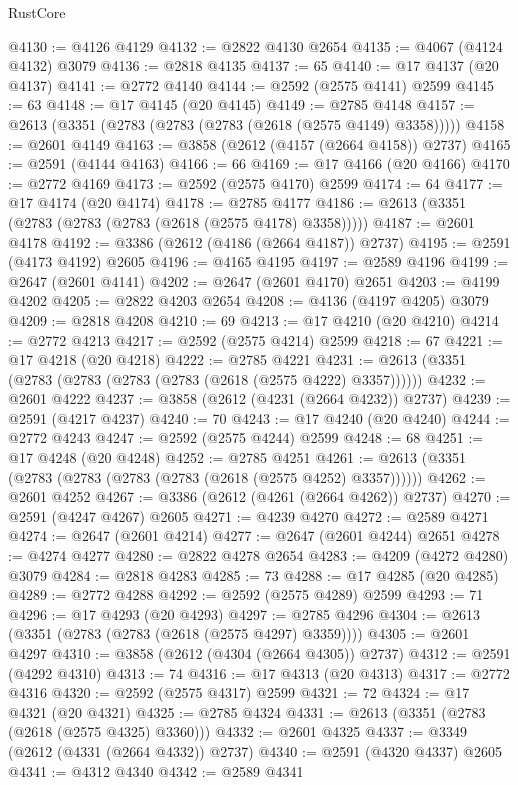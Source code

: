 \begin{lexlean}{RustCore}
\begin{coremodule}
@4130 := @4126 @4129
@4132 := @2822 @4130 @2654
@4135 := @4067 (@4124 @4132) @3079
@4136 := @2818 @4135
@4137 := 65
@4140 := @17 @4137 (@20 @4137)
@4141 := @2772 @4140
@4144 := @2592 (@2575 @4141) @2599
@4145 := 63
@4148 := @17 @4145 (@20 @4145)
@4149 := @2785 @4148
@4157 := @2613 (@3351 (@2783 (@2783 (@2783 (@2618 (@2575 @4149) @3358)))))
@4158 := @2601 @4149
@4163 := @3858 (@2612 (@4157 (@2664 @4158)) @2737)
@4165 := @2591 (@4144 @4163)
@4166 := 66
@4169 := @17 @4166 (@20 @4166)
@4170 := @2772 @4169
@4173 := @2592 (@2575 @4170) @2599
@4174 := 64
@4177 := @17 @4174 (@20 @4174)
@4178 := @2785 @4177
@4186 := @2613 (@3351 (@2783 (@2783 (@2783 (@2618 (@2575 @4178) @3358)))))
@4187 := @2601 @4178
@4192 := @3386 (@2612 (@4186 (@2664 @4187)) @2737)
@4195 := @2591 (@4173 @4192) @2605
@4196 := @4165 @4195
@4197 := @2589 @4196
@4199 := @2647 (@2601 @4141)
@4202 := @2647 (@2601 @4170) @2651
@4203 := @4199 @4202
@4205 := @2822 @4203 @2654
@4208 := @4136 (@4197 @4205) @3079
@4209 := @2818 @4208
@4210 := 69
@4213 := @17 @4210 (@20 @4210)
@4214 := @2772 @4213
@4217 := @2592 (@2575 @4214) @2599
@4218 := 67
@4221 := @17 @4218 (@20 @4218)
@4222 := @2785 @4221
@4231 := @2613 (@3351 (@2783 (@2783 (@2783 (@2783 (@2618 (@2575 @4222) @3357))))))
@4232 := @2601 @4222
@4237 := @3858 (@2612 (@4231 (@2664 @4232)) @2737)
@4239 := @2591 (@4217 @4237)
@4240 := 70
@4243 := @17 @4240 (@20 @4240)
@4244 := @2772 @4243
@4247 := @2592 (@2575 @4244) @2599
@4248 := 68
@4251 := @17 @4248 (@20 @4248)
@4252 := @2785 @4251
@4261 := @2613 (@3351 (@2783 (@2783 (@2783 (@2783 (@2618 (@2575 @4252) @3357))))))
@4262 := @2601 @4252
@4267 := @3386 (@2612 (@4261 (@2664 @4262)) @2737)
@4270 := @2591 (@4247 @4267) @2605
@4271 := @4239 @4270
@4272 := @2589 @4271
@4274 := @2647 (@2601 @4214)
@4277 := @2647 (@2601 @4244) @2651
@4278 := @4274 @4277
@4280 := @2822 @4278 @2654
@4283 := @4209 (@4272 @4280) @3079
@4284 := @2818 @4283
@4285 := 73
@4288 := @17 @4285 (@20 @4285)
@4289 := @2772 @4288
@4292 := @2592 (@2575 @4289) @2599
@4293 := 71
@4296 := @17 @4293 (@20 @4293)
@4297 := @2785 @4296
@4304 := @2613 (@3351 (@2783 (@2783 (@2618 (@2575 @4297) @3359))))
@4305 := @2601 @4297
@4310 := @3858 (@2612 (@4304 (@2664 @4305)) @2737)
@4312 := @2591 (@4292 @4310)
@4313 := 74
@4316 := @17 @4313 (@20 @4313)
@4317 := @2772 @4316
@4320 := @2592 (@2575 @4317) @2599
@4321 := 72
@4324 := @17 @4321 (@20 @4321)
@4325 := @2785 @4324
@4331 := @2613 (@3351 (@2783 (@2618 (@2575 @4325) @3360)))
@4332 := @2601 @4325
@4337 := @3349 (@2612 (@4331 (@2664 @4332)) @2737)
@4340 := @2591 (@4320 @4337) @2605
@4341 := @4312 @4340
@4342 := @2589 @4341

\end{coremodule}
\end{lexlean}
